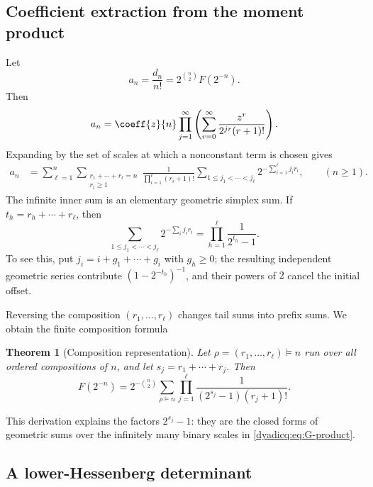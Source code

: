 \documentclass[11pt,oneside]{article}
\newtheorem{theorem}{Theorem}[section]
\theoremstyle{definition}
\theoremstyle{remark}
\begin{document}
\subsection{Coefficient extraction from the moment product}

Let
\begin{equation}\label{dyadicq:eq:an-definition}
  a_n=\frac{d_n}{n!}=2^{\binom n2}F(2^{-n}).
\end{equation}
Then
\begin{equation}\label{dyadicq:eq:an-coeff}
  a_n=\coeff{z}{n}\prod_{j=1}^{\infty}
  \left(\sum_{r=0}^{\infty}
  \frac{z^r}{2^{jr}(r+1)!}\right).
\end{equation}
Expanding by the set of scales at which a nonconstant term is chosen gives
\begin{align}\label{dyadicq:eq:scale-selection}
 a_n
 &=\sum_{\ell=1}^{n}
   \sum_{\substack{r_1+\cdots+r_\ell=n\\r_i\ge1}}
   \frac1{\prod_{i=1}^{\ell}(r_i+1)!}
   \sum_{1\le j_1<\cdots<j_\ell}
   2^{-\sum_{i=1}^{\ell}j_ir_i},
 \qquad(n\ge1).
\end{align}
The infinite inner sum is an elementary geometric simplex sum.  If
$t_h=r_h+\cdots+r_\ell$, then
\begin{equation}\label{dyadicq:eq:geometric-simplex}
 \sum_{1\le j_1<\cdots<j_\ell}
 2^{-\sum_i j_ir_i}
 =\prod_{h=1}^{\ell}\frac1{2^{t_h}-1}.
\end{equation}
To see this, put
$j_i=i+g_1+\cdots+g_i$ with $g_h\ge0$; the resulting independent geometric
series contribute $(1-2^{-t_h})^{-1}$, and their powers of $2$ cancel the
initial offset.

Reversing the composition $(r_1,\ldots,r_\ell)$ changes tail sums into prefix
sums.  We obtain the finite composition formula
\begin{theorem}[Composition representation]\label{dyadicq:thm:composition}
Let $\rho=(r_1,\ldots,r_\ell)\vDash n$ run over all ordered compositions of
$n$, and let $s_j=r_1+\cdots+r_j$.  Then
\begin{equation}\label{dyadicq:eq:composition-formula}
 \boxed{
 F(2^{-n})
 =2^{-\binom n2}
 \sum_{\rho\vDash n}
 \prod_{j=1}^{\ell}
 \frac1{(2^{s_j}-1)(r_j+1)!}.}
\end{equation}
\end{theorem}
This derivation explains the factors $2^{s_j}-1$: they are the closed forms of
geometric sums over the infinitely many binary scales in
\eqref{dyadicq:eq:G-product}.

\subsection{A lower-Hessenberg determinant}
\end{document}
